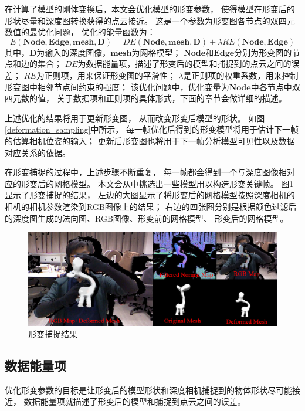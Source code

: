 在计算了模型的刚体变换后，本文会优化模型的形变参数，
使得模型在形变后的形状尽量和深度图转换获得的点云接近。
这是一个参数为形变图各节点的双四元数值的最优化问题，
优化的能量函数为：
\begin{equation}
    E(\bm{Node},\bm{Edge},\bm{mesh},\bm{D})=DE(\bm{Node},\bm{mesh},\bm{D})+
    \lambda RE(\bm{Node},\bm{Edge})
\end{equation}
其中，$\bm{D}$为输入的深度图像，$\bm{mesh}$为网格模型；
$\bm{Node}$和$\bm{Edge}$分别为形变图的节点和边的集合；
$DE$为数据能量项，描述了形变后的模型和捕捉到的点云之间的误差；
$RE$为正则项，用来保证形变图的平滑性；
$\lambda$是正则项的权重系数，用来控制形变图中相邻节点间约束的强度；
该优化问题中，优化变量为$\bm{Node}$中各节点中双四元数的值，
关于数据项和正则项的具体形式，下面的章节会做详细的描述。

上述优化的结果将用于更新形变图，
从而改变形变后模型的形状。
如图\ref{deformation_sampling}中所示，
每一帧优化后得到的形变模型将用于估计下一帧的估算相机位姿的输入；
更新后形变图也将用于下一帧分析模型可见性以及数据对应关系的依据。

在形变捕捉的过程中，上述步骤不断重复，
每一帧都会得到一个与深度图像相对应的形变后的网格模型。
本文会从中挑选出一些模型用以构造形变关键帧。
图\ref{deformation_sampling_demo}显示了形变捕捉的结果，
左边的大图显示了将形变后的网格模型按照深度相机的相机的相机参数渲染到RGB图像上的结果；
右边的四张图分别是根据颜色过滤后的深度图生成的法向图、RGB图像、形变前的网格模型、
形变后的网格模型。

\begin{figure}
    \centering
    \includegraphics[width = \textwidth]{./Pictures/defSamp.png}
    \caption{形变捕捉结果}
    \label{deformation_sampling_demo}
\end{figure}
\subsection{数据能量项}
优化形变参数的目标是让形变后的模型形状和深度相机捕捉到的物体形状尽可能接近，
数据能量项就描述了形变后的模型和捕捉到点云之间的误差。

